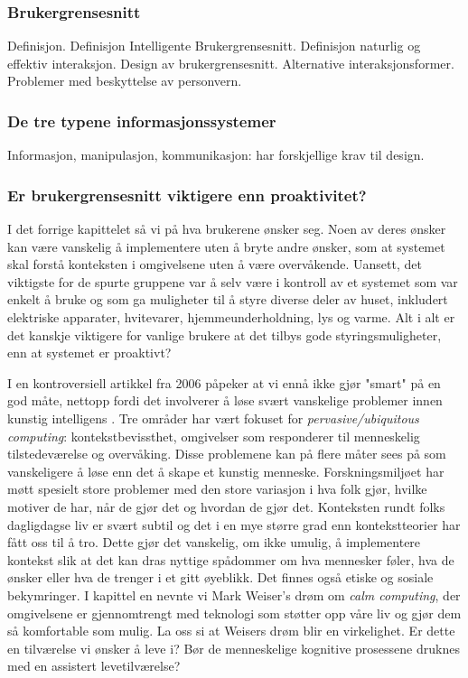 \subsubsection{Brukergrensesnitt}
Definisjon. Definisjon Intelligente Brukergrensesnitt. Definisjon naturlig og effektiv interaksjon. Design av brukergrensesnitt. Alternative interaksjonsformer. Problemer med beskyttelse av personvern.

\subsubsection*{De tre typene informasjonssystemer}
Informasjon, manipulasjon, kommunikasjon: har forskjellige krav til design.

\subsubsection*{Er brukergrensesnitt viktigere enn proaktivitet?}
I det forrige kapittelet så vi på hva brukerene ønsker seg. Noen av deres ønsker kan være vanskelig å implementere uten å bryte andre ønsker, som at systemet skal forstå konteksten i omgivelsene uten å være overvåkende. Uansett, det viktigste for de spurte gruppene var å selv være i kontroll av et systemet som var enkelt å bruke og som ga muligheter til å styre diverse deler av huset, inkludert elektriske apparater, hvitevarer, hjemmeunderholdning, lys og varme. Alt i alt er det kanskje viktigere for vanlige brukere at det tilbys gode styringsmuligheter, enn at systemet er proaktivt?

I en kontroversiell artikkel fra 2006 påpeker \citet{rogers06} at vi ennå ikke gjør "smart" på en god måte, nettopp fordi det involverer å løse svært vanskelige problemer innen kunstig intelligens . Tre områder har vært fokuset for \emph{pervasive/ubiquitous computing}: kontekstbevissthet, omgivelser som responderer til menneskelig tilstedeværelse og overvåking. Disse problemene kan på flere måter sees på som vanskeligere å løse enn det å skape et kunstig menneske. Forskningsmiljøet har møtt spesielt store problemer med den store variasjon i hva folk gjør, hvilke motiver de har, når de gjør det og hvordan de gjør det. Konteksten rundt folks dagligdagse liv er svært subtil og det i en mye større grad enn kontekstteorier har fått oss til å tro. Dette gjør det vanskelig, om ikke umulig, å implementere kontekst slik at det kan dras nyttige spådommer om hva mennesker føler, hva de ønsker eller hva de trenger i et gitt øyeblikk. Det finnes også etiske og sosiale bekymringer. I kapittel en nevnte vi Mark Weiser's drøm om \emph{calm computing}, der omgivelsene er gjennomtrengt med teknologi som støtter opp våre liv og gjør dem så komfortable som mulig. La oss si at Weisers drøm blir en virkelighet. Er dette en tilværelse vi ønsker å leve i? Bør de menneskelige kognitive prosessene druknes med en assistert levetilværelse?

